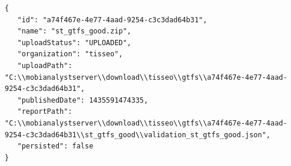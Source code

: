 \begin{lstlisting}
{
   "id": "a74f467e-4e77-4aad-9254-c3c3dad64b31",
   "name": "st_gtfs_good.zip",
   "uploadStatus": "UPLOADED",
   "organization": "tisseo",
   "uploadPath": "C:\\mobianalystserver\\download\\tisseo\\gtfs\\a74f467e-4e77-4aad-9254-c3c3dad64b31",
   "publishedDate": 1435591474335,
   "reportPath": "C:\\mobianalystserver\\download\\tisseo\\gtfs\\a74f467e-4e77-4aad-9254-c3c3dad64b31\\st_gtfs_good\\validation_st_gtfs_good.json",
   "persisted": false
}
\end{lstlisting}